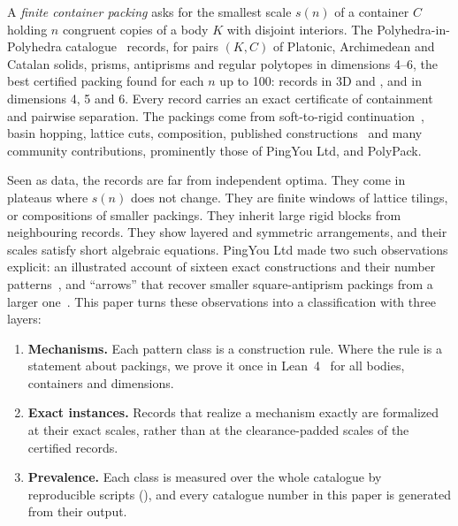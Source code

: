 \documentclass[11pt,a4paper]{article}
\begin{document}
A \emph{finite container packing} asks for the smallest scale $s(n)$ of a container $C$ holding $n$ congruent copies of a body $K$ with disjoint interiors. The Polyhedra-in-Polyhedra catalogue~\cite{archive} records, for \nFamilies{} pairs $(K,C)$ of Platonic, Archimedean and Catalan solids, prisms, antiprisms and regular polytopes in dimensions 4--6, the best certified packing found for each $n$ up to 100: \nThreeD{} records in 3D and \nFourD{}, \nFiveD{} and \nSixD{} in dimensions 4, 5 and 6. Every record carries an exact certificate of containment and pairwise separation. The packings come from soft-to-rigid continuation~\cite{nakajima2026,zarzueloMethods}, basin hopping, lattice cuts, composition, published constructions~\cite{berthold2026} and many community contributions, prominently those of PingYou Ltd,  and PolyPack.

Seen as data, the records are far from independent optima. They come in plateaus where $s(n)$ does not change. They are finite windows of lattice tilings, or compositions of smaller packings. They inherit large rigid blocks from neighbouring records. They show layered and symmetric arrangements, and their scales satisfy short algebraic equations. PingYou Ltd made two such observations explicit: an illustrated account of sixteen exact constructions and their number patterns~\cite{pingSixteen}, and ``arrows'' that recover smaller square-antiprism packings from a larger one~\cite{pingArrows}. This paper turns these observations into a classification with three layers:
\begin{enumerate}
\item \textbf{Mechanisms.} Each pattern class is a construction rule. Where the rule is a statement about packings, we prove it once in Lean~4~\cite{mathlib} for all bodies, containers and dimensions.
\item \textbf{Exact instances.} Records that realize a mechanism exactly are formalized at their exact scales, rather than at the clearance-padded scales of the certified records.
\item \textbf{Prevalence.} Each class is measured over the whole catalogue by reproducible scripts (), and every catalogue number in this paper is generated from their output.
\end{enumerate}
\end{document}
